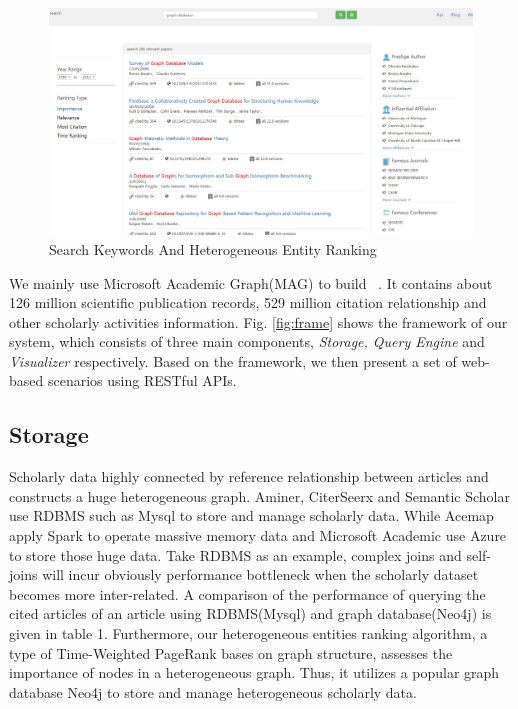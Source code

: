 \begin{figure}[tp]
\centering
\includegraphics[width=\textwidth]{searchKeywords110.pdf}
\caption{Search Keywords And Heterogeneous Entity Ranking}
\label{fig: search keywords}
\vspace{-3ex}
\end{figure}

\par
We mainly use Microsoft Academic Graph(MAG) to build \oursystem ~\cite{sinha2015overview}. It contains about 126 million scientific publication records, 529 million citation relationship and other scholarly activities information. Fig. \ref{fig:frame} shows the framework of our system, which consists of three main components, \emph{Storage, Query Engine} and \emph{Visualizer} respectively. Based on the framework, we then present a set of web-based scenarios using RESTful APIs.



\subsection{Storage}

Scholarly data highly connected by reference relationship between articles and constructs a huge heterogeneous graph. Aminer, CiterSeerx and Semantic Scholar use RDBMS such as Mysql to store and manage scholarly data. While Acemap apply Spark to operate massive memory data and Microsoft Academic use Azure to store those huge data. Take RDBMS as an example, complex joins and self-joins will incur obviously performance bottleneck when the scholarly dataset becomes more inter-related. A comparison of the performance of querying the cited articles of an article using RDBMS(Mysql) and graph database(Neo4j) is given in table 1. Furthermore, our heterogeneous entities ranking algorithm, a type of Time-Weighted PageRank bases on graph structure, assesses the importance of nodes in a heterogeneous graph. Thus, it utilizes a popular graph database Neo4j to store and manage heterogeneous scholarly data.

